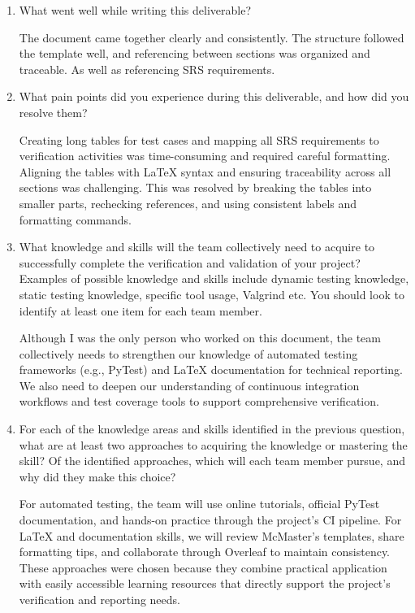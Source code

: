 \documentclass[12pt, titlepage]{article}
\begin{document}
\begin{enumerate}
  \item What went well while writing this deliverable? 
  
  The document came together clearly and consistently. The structure followed the template well, and referencing between sections was organized and traceable. 
  As well as referencing SRS requirements.
  
  \item What pain points did you experience during this deliverable, and how
    did you resolve them?
     
  Creating long tables for test cases and mapping all SRS requirements to verification activities was time-consuming and required careful formatting. 
  Aligning the tables with LaTeX syntax and ensuring traceability across all sections was challenging. 
  This was resolved by breaking the tables into smaller parts, rechecking references, and using consistent labels and formatting commands.
  
  \item What knowledge and skills will the team collectively need to acquire to
    successfully complete the verification and validation of your project?
    Examples of possible knowledge and skills include dynamic testing knowledge,
    static testing knowledge, specific tool usage, Valgrind etc.  You should look to
    identify at least one item for each team member.
 
  Although I was the only person who worked on this document, 
  the team collectively needs to strengthen our knowledge of automated testing frameworks (e.g., PyTest) and LaTeX documentation for technical reporting. 
  We also need to deepen our understanding of continuous integration workflows and test coverage tools to support comprehensive verification.
  
  \item For each of the knowledge areas and skills identified in the previous
    question, what are at least two approaches to acquiring the knowledge or
    mastering the skill?  Of the identified approaches, which will each team
    member pursue, and why did they make this choice?
  
  For automated testing, the team will use online tutorials, official PyTest documentation, and hands-on practice through the project’s CI pipeline. 
  For LaTeX and documentation skills, we will review McMaster’s templates, share formatting tips, and collaborate through Overleaf to maintain consistency. 
  These approaches were chosen because they combine practical application with easily accessible learning resources that directly support the project’s verification and reporting needs.
\end{enumerate}
\end{document}
